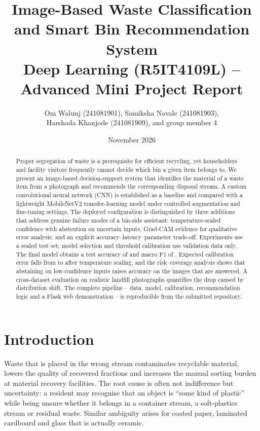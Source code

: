 \documentclass[11pt,a4paper]{article}
\title{\textbf{Image-Based Waste Classification and Smart Bin Recommendation System}\\
{\large Deep Learning (R5IT4109L) -- Advanced Mini Project Report}}
\author{Om Walunj (241081901), Samiksha Navale (241081903),\\
Harshada Khanjode (241081909), and group member 4}
\date{November 2026}
\begin{document}
\maketitle

\begin{abstract}
\noindent Proper segregation of waste is a prerequisite for efficient recycling, yet
householders and facility visitors frequently cannot decide which bin a given item belongs
to. We present an image-based decision-support system that identifies the material of a
waste item from a photograph and recommends the corresponding disposal stream. A custom
convolutional neural network (CNN) is established as a baseline and compared with a
lightweight MobileNetV2 transfer-learning model under controlled augmentation and
fine-tuning settings. The deployed configuration is distinguished by three additions that
address genuine failure modes of a bin-side assistant: temperature-scaled confidence with
abstention on uncertain inputs, Grad-CAM evidence for qualitative error analysis, and an
explicit accuracy--latency--parameter trade-off. Experiments use a sealed test set; model
selection and threshold calibration use validation data only. The final model obtains a
test accuracy of \testAcc{} and macro F1 of \testFone{}. Expected calibration error falls
from \eceBefore{} to \eceAfter{} after temperature scaling, and the risk--coverage analysis
shows that abstaining on low-confidence inputs raises accuracy on the images that are
answered. A cross-dataset evaluation on realistic landfill photographs quantifies the
drop caused by distribution shift. The complete pipeline -- data, model, calibration,
recommendation logic and a Flask web demonstration -- is reproducible from the submitted
repository.
\end{abstract}

\tableofcontents
\newpage

\section{Introduction}
\label{sec:intro}

Waste that is placed in the wrong stream contaminates recyclable material, lowers the
quality of recovered fractions and increases the manual sorting burden at material
recovery facilities. The root cause is often not indifference but uncertainty: a resident
may recognise that an object is ``some kind of plastic'' while being unsure whether it
belongs in a container stream, a soft-plastics stream or residual waste. Similar ambiguity
arises for coated paper, laminated cardboard and glass that is actually ceramic.
\end{document}
